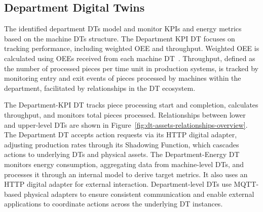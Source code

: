
\subsection{Department Digital Twins}
\label{subsec:dt-department-level}

The identified department DTs model and monitor KPIs and energy metrics based on the machine DTs structure. The Department KPI DT focuses on tracking performance, including weighted OEE and throughput. Weighted OEE is calculated using OEEs received from each machine DT~\cite{OEE-manufacturing-cell-Gamberini-2017}.
Throughput, defined as the number of processed pieces per time unit in production systems, is tracked by monitoring entry and exit events of pieces processed by machines within the department, facilitated by relationships in the DT ecosystem.

The Department-KPI DT tracks piece processing start and completion, calculates throughput, and monitors total pieces processed.
Relationships between lower and upper-level DTs are shown in Figure~\ref{fig:dt-assets-relationships-overview}.
The Department DT accepts action requests via its HTTP digital adapter, adjusting production rates through its Shadowing Function, which cascades actions to underlying DTs and physical assets.
The Department-Energy DT monitors energy consumption, aggregating data from machine-level DTs, and processes it through an internal model to derive target metrics.
It also uses an HTTP digital adapter for external interaction.
Department-level DTs use MQTT-based physical adapters to ensure consistent communication and enable external applications to coordinate actions across the underlying DT instances.



